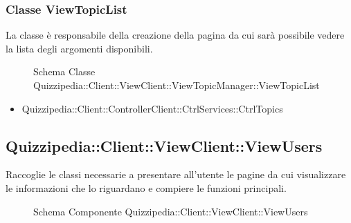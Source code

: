 \subsubsection{Classe ViewTopicList}
La classe è responsabile della creazione della pagina da cui sarà possibile vedere la lista degli argomenti disponibili.
\begin{figure}[H]
\centering
\noindent{}
\caption[Schema Classe ViewTopicList]{Schema Classe Quizzipedia::Client::ViewClient::ViewTopicManager::ViewTopicList}
\end{figure}
\begin{itemize}
\item Quizzipedia::Client::ControllerClient::CtrlServices::CtrlTopics
\end{itemize}
\subsection{Quizzipedia::Client::ViewClient::ViewUsers}
Raccoglie le classi necessarie a presentare all'utente le pagine da cui visualizzare le informazioni che lo riguardano e compiere le funzioni principali.
\begin{figure}[H]
\centering
\noindent{}
\caption[Schema Componente Quizzipedia::Client::ViewClient::ViewUsers]{Schema Componente Quizzipedia::Client::ViewClient::ViewUsers}
\end{figure}
